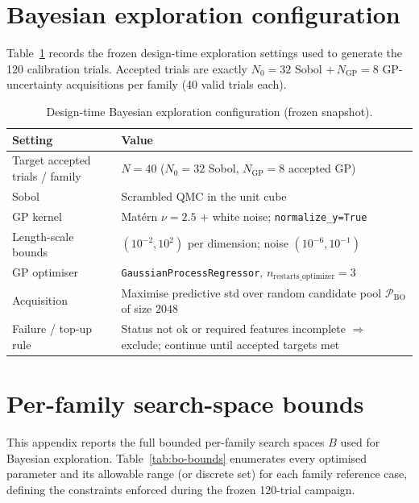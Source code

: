 \documentclass[a4paper,fleqn]{cas-dc}
\begin{document}
{\section{Bayesian exploration configuration}\label{app:bo-config}

Table~\ref{tab:bo-config} records the frozen design-time exploration settings
used to generate the 120 calibration trials. Accepted trials are exactly
$N_0{=}32$ Sobol $+\,N_{\mathrm{GP}}{=}8$ GP-uncertainty acquisitions per family
(40 valid trials each).

\begin{table}[t]
\caption{Design-time Bayesian exploration configuration (frozen snapshot).}\label{tab:bo-config}
\begin{tabular*}{\textwidth}{@{\extracolsep{\fill}} l l @{}}
\toprule
Setting & Value \\
\midrule
Target accepted trials / family & $N{=}40$ ($N_0{=}32$ Sobol, $N_{\mathrm{GP}}{=}8$ accepted GP) \\
Sobol & Scrambled QMC in the unit cube \\
GP kernel & Mat\'{e}rn $\nu{=}2.5$ $+$ white noise; \texttt{normalize\_y=True} \\
Length-scale bounds & $(10^{-2},10^{2})$ per dimension; noise $(10^{-6},10^{-1})$ \\
GP optimiser & \texttt{GaussianProcessRegressor}, $n_{\mathrm{restarts\_optimizer}}{=}3$ \\
Acquisition & Maximise predictive std over random candidate pool $\mathcal{P}_{\mathrm{BO}}$ of size $2048$ \\
Failure / top-up rule & Status not ok or required features incomplete $\Rightarrow$ exclude; continue until accepted targets met \\
\bottomrule
\end{tabular*}
\end{table}

\section{Per-family search-space bounds}\label{app:search-bounds}

This appendix reports the full bounded per-family search spaces $B$ used for Bayesian exploration. Table~\ref{tab:bo-bounds} enumerates every optimised parameter and its allowable range (or discrete set) for each family reference case, defining the constraints enforced during the frozen 120-trial campaign.

}
\end{document}
